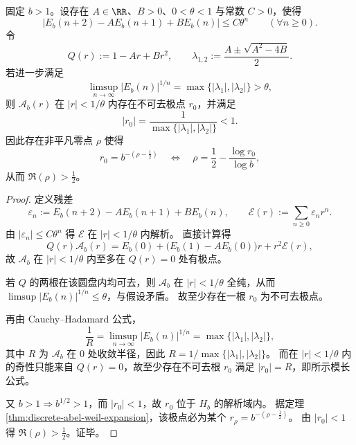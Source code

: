 

\begin{theorem}[指数精度二阶递归强制右端零点出现]\label{thm:xi-abel-ar2-exp-error-forces-rightedge-zero}
固定 \(b>1\)。设存在 \(A\in\RR\)、\(B>0\)、\(0<\theta<1\) 与常数 \(C>0\)，使得
\[
\bigl|E_b(n+2)-AE_b(n+1)+BE_b(n)\bigr|\le C\theta^n
\qquad(\forall n\ge 0).
\]
令
\[
Q(r):=1-Ar+Br^2,\qquad
\lambda_{1,2}:=\frac{A\pm\sqrt{A^2-4B}}{2}.
\]
若进一步满足
\[
\limsup_{n\to\infty}|E_b(n)|^{1/n}
=\max\{|\lambda_1|,|\lambda_2|\}
>\theta,
\]
则 \(\mathcal A_b(r)\) 在 \(|r|<1/\theta\) 内存在不可去极点 \(r_0\)，并满足
\[
|r_0|=\frac{1}{\max\{|\lambda_1|,|\lambda_2|\}}<1.
\]
因此存在非平凡零点 \(\rho\) 使得
\[
r_0=b^{-(\rho-\frac12)}
\quad\Longleftrightarrow\quad
\rho=\frac12-\frac{\log r_0}{\log b},
\]
从而 \(\Re(\rho)>\frac12\)。
\end{theorem}
\begin{proof}
定义残差
\[
\varepsilon_n:=E_b(n+2)-AE_b(n+1)+BE_b(n),\qquad
\mathcal E(r):=\sum_{n\ge 0}\varepsilon_n r^n.
\]
由 \(|\varepsilon_n|\le C\theta^n\) 得 \(\mathcal E\) 在 \(|r|<1/\theta\) 内解析。
直接计算得
\[
Q(r)\mathcal A_b(r)
=E_b(0)+\bigl(E_b(1)-AE_b(0)\bigr)r+r^2\mathcal E(r),
\]
故 \(\mathcal A_b\) 在 \(|r|<1/\theta\) 内至多在 \(Q(r)=0\) 处有极点。

若 \(Q\) 的两根在该圆盘内均可去，则 \(\mathcal A_b\) 在 \(|r|<1/\theta\) 全纯，从而
\(
\limsup |E_b(n)|^{1/n}\le \theta
\)，与假设矛盾。
故至少存在一根 \(r_0\) 为不可去极点。

再由 Cauchy--Hadamard 公式，
\[
\frac{1}{R}=\limsup_{n\to\infty}|E_b(n)|^{1/n}
=\max\{|\lambda_1|,|\lambda_2|\},
\]
其中 \(R\) 为 \(\mathcal A_b\) 在 \(0\) 处收敛半径，因此
\(
R=1/\max\{|\lambda_1|,|\lambda_2|\}
\)。
而在 \(|r|<1/\theta\) 内的奇性只能来自 \(Q(r)=0\)，故至少存在不可去根 \(r_0\) 满足 \(|r_0|=R\)，即所示模长公式。

又 \(b>1\Rightarrow b^{1/2}>1\)，而 \(|r_0|<1\)，故 \(r_0\) 位于 \(H_b\) 的解析域内。
据定理 \ref{thm:discrete-abel-weil-expansion}，该极点必为某个
\(
r_\rho=b^{-(\rho-\frac12)}
\)。
由 \(|r_0|<1\) 得 \(\Re(\rho)>\frac12\)。证毕。
\end{proof}

